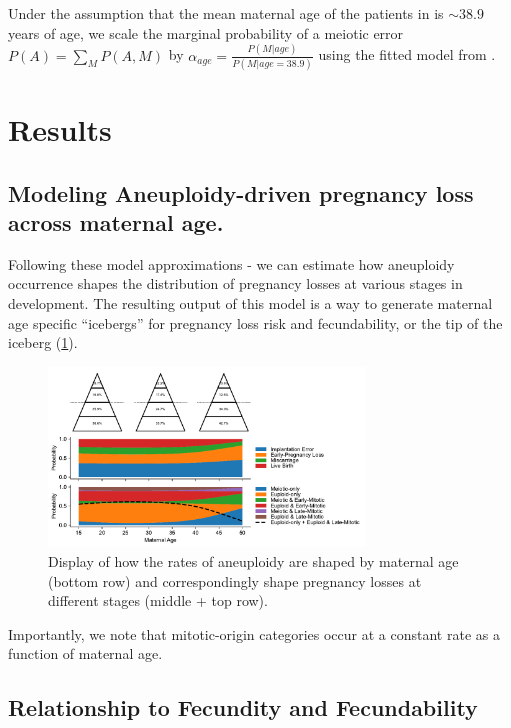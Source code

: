 \documentclass{article}
\begin{document}
Under the assumption that the mean maternal age of the patients in \citep{McCoy2023-dg} is $\sim 38.9$ years of age, we scale the marginal probability of a meiotic error $P(A) = \sum_M P(A,M)$ by $\alpha_{age} = \frac{P(M | age)}{P(M | age = 38.9)}$ using the fitted model from \citep{Gruhn2019-al}.

\section*{Results}

\subsection*{Modeling Aneuploidy-driven pregnancy loss across maternal age.}

Following these model approximations - we can estimate how aneuploidy occurrence shapes the distribution of pregnancy losses at various stages in development. The resulting output of this model is a way to generate maternal age specific ``icebergs'' for pregnancy loss risk and fecundability, or the tip of the iceberg (\ref{fig:2}). 

\begin{figure}[H]
\begin{center}
    \includegraphics[width=0.75\textwidth]{figures/model_figure.042024.pdf}
\end{center}
\vspace{-1.5em}
\caption{Display of how the rates of aneuploidy are shaped by maternal age (bottom row) and correspondingly shape pregnancy losses at different stages (middle + top row).}
\label{fig:2}
\end{figure}

Importantly, we note that mitotic-origin categories occur at a constant rate as a function of maternal age. 

\subsection*{Relationship to Fecundity and Fecundability}
\end{document}
